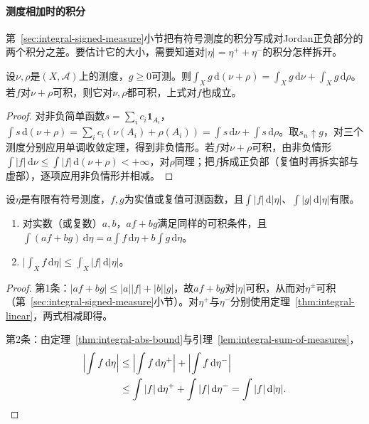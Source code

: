 \paragraph{测度相加时的积分}
第~\ref{sec:integral-signed-measure}小节把有符号测度的积分写成对Jordan正负部分的两个积分之差。要估计它的大小，需要知道对$|\eta|=\eta^++\eta^-$的积分怎样拆开。

\begin{lemma}[测度之和的积分]
\label{lem:integral-sum-of-measures}
设$\nu,\rho$是$(X,\mathcal A)$上的测度，$g\ge0$可测。则$\int_Xg\,\mathrm d(\nu+\rho)=\int_Xg\,\mathrm d\nu+\int_Xg\,\mathrm d\rho$。若$f$对$\nu+\rho$可积，则它对$\nu,\rho$都可积，上式对$f$也成立。
\end{lemma}

\begin{proof}
对非负简单函数$s=\sum_ic_i\mathbf 1_{A_i}$，$\int s\,\mathrm d(\nu+\rho)=\sum_ic_i(\nu(A_i)+\rho(A_i))=\int s\,\mathrm d\nu+\int s\,\mathrm d\rho$。取$s_n\uparrow g$，对三个测度分别应用单调收敛定理，得到非负情形。若$f$对$\nu+\rho$可积，由非负情形$\int|f|\,\mathrm d\nu\le\int|f|\,\mathrm d(\nu+\rho)<+\infty$，对$\rho$同理；把$f$拆成正负部（复值时再拆实部与虚部），逐项应用非负情形并相减。
\end{proof}

\begin{theorem}[有符号测度积分的运算规则]
\label{thm:integral-signed-measure-rules}
设$\eta$是有限有符号测度，$f,g$为实值或复值可测函数，且$\int|f|\,\mathrm d|\eta|$、$\int|g|\,\mathrm d|\eta|$有限。
\begin{enumerate}
 \item 对实数（或复数）$a,b$，$af+bg$满足同样的可积条件，且$\int(af+bg)\,\mathrm d\eta=a\int f\,\mathrm d\eta+b\int g\,\mathrm d\eta$。
 \item $\bigl|\int_Xf\,\mathrm d\eta\bigr|\le\int_X|f|\,\mathrm d|\eta|$。
\end{enumerate}
\end{theorem}

\begin{proof}
第1条：$|af+bg|\le|a||f|+|b||g|$，故$af+bg$对$|\eta|$可积，从而对$\eta^\pm$可积（第~\ref{sec:integral-signed-measure}小节）。对$\eta^+$与$\eta^-$分别使用定理~\ref{thm:integral-linear}，两式相减即得。

第2条：由定理~\ref{thm:integral-abs-bound}与引理~\ref{lem:integral-sum-of-measures}，
\[
 \begin{aligned}
  \Bigl|\int f\,\mathrm d\eta\Bigr|
  &\le\Bigl|\int f\,\mathrm d\eta^+\Bigr|+\Bigl|\int f\,\mathrm d\eta^-\Bigr|\\
  &\le\int|f|\,\mathrm d\eta^++\int|f|\,\mathrm d\eta^-=\int|f|\,\mathrm d|\eta|.
 \end{aligned}
\]
\end{proof}

